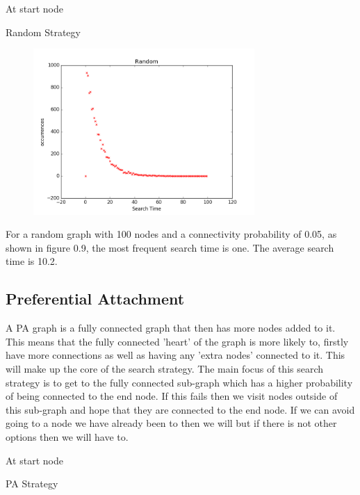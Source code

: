 \documentclass[paper=a4, fontsize=11pt]{scrartcl}
\numberwithin{equation}{section}		%
\numberwithin{figure}{section}			%
\numberwithin{table}{section}				%
\begin{document}
\begin{algorithm}[H]
 At start node\;
 \caption{Random Strategy}
\end{algorithm}

\begin{figure}[p]
\center
\caption{}
\includegraphics[width=0.75\textwidth]{pictures/randomSearch.png}
\end{figure}

For a random graph with 100 nodes and a connectivity probability of 0.05, as shown in figure 0.9, the most frequent search time is one. The average search time is 10.2. 

\subsection*{Preferential Attachment}

A PA graph is a fully connected graph that then has more nodes added to it. This means that the fully connected 'heart' of the graph is more likely to, firstly have more connections as well as having any 'extra nodes' connected to it. This will make up the core of the search strategy. The main focus of this search strategy is to get to the fully connected sub-graph which has a higher probability of being connected to the end node. If this fails then we visit nodes outside of this sub-graph and hope that they are connected to the end node. If we can avoid going to a node we have already been to then we will but if there is not other options then we will have to.\\

\begin{algorithm}[H]
 At start node\;
 \caption{PA Strategy}
\end{algorithm}
\end{document}
